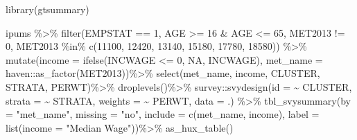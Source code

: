 \documentclass[
]{article}
\newenvironment{Shaded}{\begin{snugshade}}{\end{snugshade}}
\newcommand{\AttributeTok}[1]{\textcolor[rgb]{0.77,0.63,0.00}{#1}}
\newcommand{\ConstantTok}[1]{\textcolor[rgb]{0.00,0.00,0.00}{#1}}
\newcommand{\DecValTok}[1]{\textcolor[rgb]{0.00,0.00,0.81}{#1}}
\newcommand{\FunctionTok}[1]{\textcolor[rgb]{0.00,0.00,0.00}{#1}}
\newcommand{\NormalTok}[1]{#1}
\newcommand{\SpecialCharTok}[1]{\textcolor[rgb]{0.00,0.00,0.00}{#1}}
\newcommand{\StringTok}[1]{\textcolor[rgb]{0.31,0.60,0.02}{#1}}
\begin{document}
\begin{Shaded}
\begin{Highlighting}[]
\FunctionTok{library}\NormalTok{(gtsummary)}

\NormalTok{ipums }\SpecialCharTok{\%\textgreater{}\%}
 \FunctionTok{filter}\NormalTok{(EMPSTAT }\SpecialCharTok{==} \DecValTok{1}\NormalTok{,}
\NormalTok{         AGE }\SpecialCharTok{\textgreater{}=} \DecValTok{16} \SpecialCharTok{\&}\NormalTok{ AGE }\SpecialCharTok{\textless{}=} \DecValTok{65}\NormalTok{, }
\NormalTok{         MET2013 }\SpecialCharTok{!=} \DecValTok{0}\NormalTok{, }
\NormalTok{         MET2013 }\SpecialCharTok{\%in\%} \FunctionTok{c}\NormalTok{(}\DecValTok{11100}\NormalTok{, }\DecValTok{12420}\NormalTok{, }\DecValTok{13140}\NormalTok{, }\DecValTok{15180}\NormalTok{, }\DecValTok{17780}\NormalTok{, }\DecValTok{18580}\NormalTok{)) }\SpecialCharTok{\%\textgreater{}\%} 
  \FunctionTok{mutate}\NormalTok{(}\AttributeTok{income =} \FunctionTok{ifelse}\NormalTok{(INCWAGE }\SpecialCharTok{\textless{}=} \DecValTok{0}\NormalTok{, }\ConstantTok{NA}\NormalTok{, INCWAGE),}
         \AttributeTok{met\_name =}\NormalTok{ haven}\SpecialCharTok{::}\FunctionTok{as\_factor}\NormalTok{(MET2013))}\SpecialCharTok{\%\textgreater{}\%}
  \FunctionTok{select}\NormalTok{(met\_name,  income, CLUSTER, STRATA, PERWT)}\SpecialCharTok{\%\textgreater{}\%}
  \FunctionTok{droplevels}\NormalTok{()}\SpecialCharTok{\%\textgreater{}\%}
\NormalTok{  survey}\SpecialCharTok{::}\FunctionTok{svydesign}\NormalTok{(}\AttributeTok{id =} \SpecialCharTok{\textasciitilde{}}\NormalTok{ CLUSTER,}
                   \AttributeTok{strata =} \SpecialCharTok{\textasciitilde{}}\NormalTok{ STRATA,}
                   \AttributeTok{weights =} \SpecialCharTok{\textasciitilde{}}\NormalTok{ PERWT,}
                \AttributeTok{data =}\NormalTok{ .) }\SpecialCharTok{\%\textgreater{}\%}
   \FunctionTok{tbl\_svysummary}\NormalTok{(}\AttributeTok{by =} \StringTok{"met\_name"}\NormalTok{,}
                  \AttributeTok{missing =} \StringTok{"no"}\NormalTok{,}
                  \AttributeTok{include =} \FunctionTok{c}\NormalTok{(met\_name, income), }
                  \AttributeTok{label =} \FunctionTok{list}\NormalTok{(}\AttributeTok{income =} \StringTok{"Median Wage"}\NormalTok{))}\SpecialCharTok{\%\textgreater{}\%}
  \FunctionTok{as\_hux\_table}\NormalTok{()}
\end{Highlighting}
\end{Shaded}

 
  \providecommand{\huxb}[2]{\arrayrulecolor[RGB]{#1}\global\arrayrulewidth=#2pt}
  \providecommand{\huxvb}[2]{\color[RGB]{#1}\vrule width #2pt}
  \providecommand{\huxtpad}[1]{\rule{0pt}{#1}}
  \providecommand{\huxbpad}[1]{\rule[-#1]{0pt}{#1}}
\end{document}
